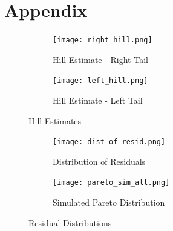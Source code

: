 \documentclass[11pt,a4paper,oldfontcommands]{memoir}
\begin{document}
{\begin{thebibliography}{53}
\end{thebibliography}

\section{Appendix}

\begin{figure}[H]
\centering
\begin{subfigure}{.5\textwidth}
  \centering
  \texttt{[image: right\_hill.png]}
  \caption{Hill Estimate - Right Tail}
  \label{fig:sub1}
\end{subfigure}%
\begin{subfigure}{.5\textwidth}
  \centering
  \texttt{[image: left\_hill.png]}
  \caption{Hill Estimate - Left Tail}
  \label{fig:sub2}
\end{subfigure}
\caption{Hill Estimates}
\label{fig:hill}
\end{figure}

\begin{figure}[H]
\centering
\begin{subfigure}{.5\textwidth}
  \centering
  \texttt{[image: dist\_of\_resid.png]}
  \caption{Distribution of Residuals}
  \label{fig:sub1}
\end{subfigure}%
\begin{subfigure}{.5\textwidth}
  \centering
  \texttt{[image: pareto\_sim\_all.png]}
  \caption{Simulated Pareto Distribution}
  \label{fig:sub2}
\end{subfigure}
\caption{Residual Distributions}
\label{fig:res_dist}
\end{figure}








}
\end{document}
